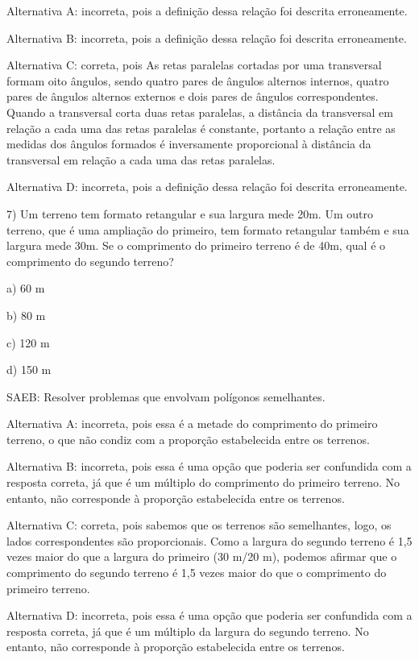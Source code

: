 Alternativa A: incorreta, pois a definição dessa relação foi descrita
erroneamente.

Alternativa B: incorreta, pois a definição dessa relação foi descrita
erroneamente.

Alternativa C: correta, pois As retas paralelas cortadas por uma
transversal formam oito ângulos, sendo quatro pares de ângulos alternos
internos, quatro pares de ângulos alternos externos e dois pares de
ângulos correspondentes. Quando a transversal corta duas retas
paralelas, a distância da transversal em relação a cada uma das retas
paralelas é constante, portanto a relação entre as medidas dos ângulos
formados é inversamente proporcional à distância da transversal em
relação a cada uma das retas paralelas.

Alternativa D: incorreta, pois a definição dessa relação foi descrita
erroneamente.

7) Um terreno tem formato retangular e sua largura mede 20m. Um outro
terreno, que é uma ampliação do primeiro, tem formato retangular também
e sua largura mede 30m. Se o comprimento do primeiro terreno é de 40m,
qual é o comprimento do segundo terreno?

a) 60 m

b) 80 m

c) 120 m

d) 150 m

SAEB: Resolver problemas que envolvam polígonos semelhantes.

Alternativa A: incorreta, pois essa é a metade do comprimento do
primeiro terreno, o que não condiz com a proporção estabelecida entre os
terrenos.

Alternativa B: incorreta, pois essa é uma opção que poderia ser
confundida com a resposta correta, já que é um múltiplo do comprimento
do primeiro terreno. No entanto, não corresponde à proporção
estabelecida entre os terrenos.

Alternativa C: correta, pois sabemos que os terrenos são semelhantes,
logo, os lados correspondentes são proporcionais. Como a largura do
segundo terreno é 1,5 vezes maior do que a largura do primeiro (30 m/20
m), podemos afirmar que o comprimento do segundo terreno é 1,5 vezes
maior do que o comprimento do primeiro terreno.

Alternativa D: incorreta, pois essa é uma opção que poderia ser
confundida com a resposta correta, já que é um múltiplo da largura do
segundo terreno. No entanto, não corresponde à proporção estabelecida
entre os terrenos.

